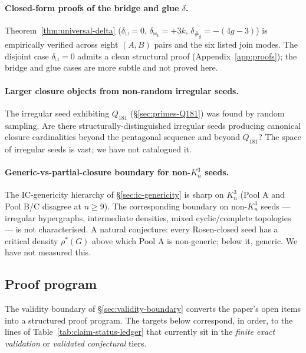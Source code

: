 \documentclass[12pt,a4paper]{article}
\theoremstyle{definition}
\theoremstyle{remark}
\newcommand{\Kn}{K_n^3}
\newcommand{\bridge}{\mathbin{\bowtie}}     %
\newcommand{\glue}{\mathbin{\#}}            %
\begin{document}
\paragraph{Closed-form proofs of the bridge and glue $\delta$.}
Theorem~\ref{thm:universal-delta} ($\delta_{\sqcup} = 0$,
$\delta_{\bridge_k} = +3k$, $\delta_{\glue_g} = -(4g-3)$) is
empirically verified across eight $(A,B)$ pairs and the six listed
join modes. The disjoint case $\delta_{\sqcup} = 0$ admits a clean
structural proof (Appendix~\ref{app:proofs}); the bridge and glue
cases are more subtle and not proved here.

\paragraph{Larger closure objects from non-random irregular seeds.}
The irregular seed exhibiting $Q_{181}$ (\S\ref{sec:primes-Q181}) was
found by random sampling. Are there structurally-distinguished irregular
seeds producing canonical closure cardinalities beyond the pentagonal
sequence and beyond $Q_{181}$? The space of irregular seeds is vast;
we have not catalogued it.

\paragraph{Generic-vs-partial-closure boundary for non-$\Kn$ seeds.}
The IC-genericity hierarchy of \S\ref{sec:ic-genericity} is sharp on
$\Kn$ (Pool A and Pool B/C disagree at $n \ge 9$). The corresponding
boundary on non-$\Kn$ seeds --- irregular hypergraphs, intermediate
densities, mixed cyclic/complete topologies --- is not characterised.
A natural conjecture: every Rosen-closed seed has a critical density
$\rho^\ast(G)$ above which Pool A is non-generic; below it, generic.
We have not measured this.

\subsection{Proof program}\label{sec:proof-program}

The validity boundary of \S\ref{sec:validity-boundary} converts the
paper's open items into a structured proof program. The targets below
correspond, in order, to the lines of
Table~\ref{tab:claim-status-ledger} that currently sit in the
\emph{finite exact validation} or \emph{validated conjectural} tiers.
\end{document}
